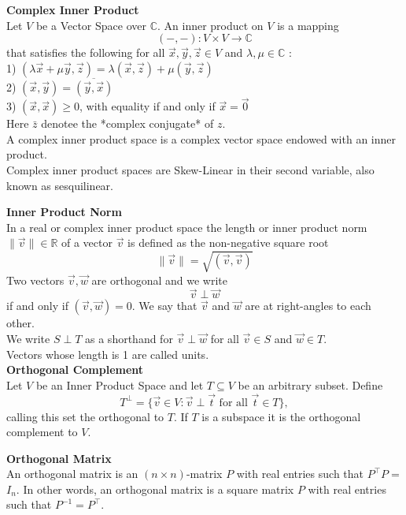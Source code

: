 \documentclass[a4paper, 10pt]{article}
\begin{document}
\begin{multicols*}{3}
\textbf{Complex Inner Product}\\
Let $V$ be a Vector Space over $\mathbb{C}$. An inner product on $V$ is a mapping
$$
(-,-): V \times V \rightarrow \mathbb{C}
$$
that satisfies the following for all $\vec{x}, \vec{y}, \vec{z} \in V$ and $\lambda, \mu \in \mathbb{C}$ :\\
1) $(\lambda \vec{x}+\mu \vec{y}, \vec{z})=\lambda(\vec{x}, \vec{z})+\mu(\vec{y}, \vec{z})$\\
2) $(\vec{x}, \vec{y})=\overline{(\vec{y}, \vec{x})}$\\
3) $(\vec{x}, \vec{x}) \geqslant 0$, with equality if and only if $\vec{x}=\overrightarrow{0}$\\
Here $\bar{z}$ denotee the *complex conjugate* of $z$. \\
A complex inner product space is a complex vector space endowed with an inner product.\\
Complex inner product spaces are Skew-Linear in their second variable, also known as sesquilinear.

\textbf{Inner Product Norm}\\
In a real or complex inner product space the length or inner product norm $\|\vec{v}\| \in \mathbb{R}$ of a vector $\vec{v}$ is defined as the non-negative square root
$$
\|\vec{v}\|=\sqrt{(\vec{v}, \vec{v})}
$$
Two vectors $\vec{v}, \vec{w}$ are orthogonal and we write
$$
\vec{v} \perp \vec{w}
$$
if and only if $(\vec{v}, \vec{w})=0$. We say that $\vec{v}$ and $\vec{w}$ are at right-angles to each other. \\
We write $S \perp T$ as a shorthand for $\vec{v} \perp \vec{w}$ for all $\vec{v} \in S$ and $\vec{w} \in T$.\\
Vectors whose length is 1 are called units.\\

\textbf{Orthogonal Complement}\\
Let $V$ be an Inner Product Space and let $T \subseteq V$ be an arbitrary subset. Define
$$
T^{\perp}=\{\vec{v} \in V: \vec{v} \perp \vec{t} \text { for all } \vec{t} \in T\},
$$
calling this set the orthogonal to $T$.
If $T$ is a subspace it is the orthogonal complement to $V$. 

\textbf{Orthogonal Matrix}\\
An orthogonal matrix is an $(n \times n)$-matrix $P$ with real entries such that $P^{\top} P=$ $I_n$. 
In other words, an orthogonal matrix is a square matrix $P$ with real entries such that $P^{-1}=P^{\top}$.



\end{multicols*}
\end{document}
